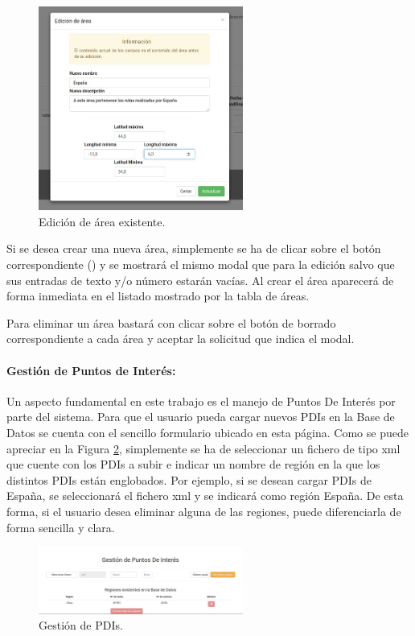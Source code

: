 \begin{figure}[h]
  \centering
    \includegraphics[width=0.6\textwidth]{../img/manualusuario/areaedit.jpg}
  \caption{Edición de área existente.}
  \label{areaedit}
\end{figure}

Si se desea crear una nueva área, simplemente se ha de clicar sobre el botón correspondiente () y se mostrará el mismo modal que para la edición salvo que sus entradas de texto y/o número estarán vacías. Al crear el área aparecerá de forma inmediata en el listado mostrado por la tabla de áreas.

Para eliminar un área bastará con clicar sobre el botón de borrado correspondiente a cada área y aceptar la solicitud que indica el modal.

\paragraph{Gestión de Puntos de Interés:} Un aspecto fundamental en este trabajo es el manejo de Puntos De Interés por parte del sistema. Para que el usuario pueda cargar nuevos PDIs en la Base de Datos se cuenta con el sencillo formulario ubicado en esta página. Como se puede apreciar en la Figura \ref{pdimanage}, simplemente se ha de seleccionar un fichero de tipo xml que cuente con los PDIs a subir e indicar un nombre de región en la que los distintos PDIs están englobados. Por ejemplo, si se desean cargar PDIs de España, se seleccionará el fichero xml y se indicará como región España. De esta forma, si el usuario desea eliminar alguna de las regiones, puede diferenciarla de forma sencilla y clara.

\begin{figure}[h]
  \centering
    \includegraphics[width=0.6\textwidth]{../img/manualusuario/pdimanage.jpg}
  \caption{Gestión de PDIs.}
  \label{pdimanage}
\end{figure}

